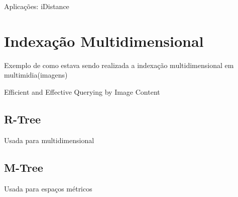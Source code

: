 Aplicações: iDistance

\cite{bptree:wiki}

\section{Indexação Multidimensional}

Exemplo de como estava sendo realizada a indexação multidimensional em multimidia(imagens)

Efficient and Effective Querying by Image Content

\subsection{R-Tree}

Usada para multidimensional

\subsection{M-Tree}

Usada para espaços métricos

\subsection{}

\printbibliography